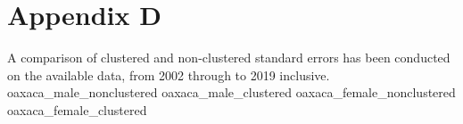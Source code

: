 \documentclass[class=article, crop=false]{standalone}
\begin{document}
\section{Appendix D}
\label{sec:appendixD}
A comparison of clustered and non-clustered standard errors has been conducted on the available data, from 2002 through to 2019 inclusive.
{oaxaca_male_nonclustered}
{oaxaca_male_clustered}
{oaxaca_female_nonclustered}
{oaxaca_female_clustered}
\doublespacing

\ifstandalone

\fi
\end{document}

